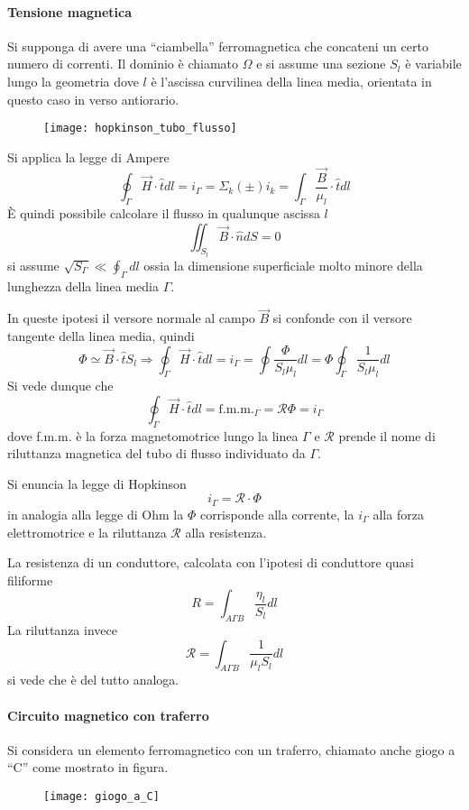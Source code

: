 \paragraph{Tensione magnetica}
Si supponga di avere una ``ciambella'' ferromagnetica che concateni un certo numero di 
correnti.
Il dominio è chiamato $\Omega$ e si assume una sezione $S_l$ è variabile lungo la 
geometria dove $l$ è l'ascissa curvilinea della linea media, orientata in questo caso in 
verso antiorario.
\begin{figure}[H]
\centering
\texttt{[image: hopkinson\_tubo\_flusso]}
\end{figure}

Si applica la legge di Ampere
$$
\oint_\Gamma \vec{H}\cdot \hat{t} dl = i_\Gamma = \Sigma_k (\pm)i_k = \int_{\Gamma}\frac{\vec{B}}{\mu_l} \cdot\hat{t}dl
$$
È quindi possibile calcolare il flusso in qualunque ascissa $l$ 
$$
\iint_{S_l}\vec{B}\cdot\hat{n} dS = 0
$$
si assume $\sqrt{S_\Gamma} \ll \oint_\Gamma dl$ ossia la dimensione superficiale molto
minore della lunghezza della linea media $\Gamma$.

In queste ipotesi il versore normale al campo $\vec{B}$ si confonde con il versore
tangente della linea media, quindi
$$
\Phi \simeq \vec{B}\cdot\hat{t}S_l \Rightarrow \oint_\Gamma \vec{H}\cdot\hat{t}dl = 
i_\Gamma = \oint\frac{\Phi}{S_l \mu_l} dl = \Phi\oint_\Gamma \frac{1}{S_l\mu_l}dl
$$
Si vede dunque che 
$$
\oint_\Gamma \vec{H}\cdot\hat{t}dl = \text{f.m.m.}_{\Gamma} = \mathcal{R} \Phi = i_\Gamma
$$
dove f.m.m. è la forza magnetomotrice lungo la linea $\Gamma$ e $\mathcal{R}$ prende
il nome di riluttanza magnetica del tubo di flusso individuato da $\Gamma$.

Si enuncia la legge di Hopkinson
$$
i_\Gamma = \mathcal{R}\cdot\Phi
$$
in analogia alla legge di Ohm la $\Phi$ corrisponde alla corrente, la $i_\Gamma$ alla 
forza elettromotrice e la riluttanza $\mathcal{R}$ alla resistenza.

La resistenza di un conduttore, calcolata con l'ipotesi di conduttore quasi filiforme
$$
R = \int_{A\Gamma B} \frac{\eta_l}{S_l}dl
$$
La riluttanza invece
$$
\mathcal{R} = \int_{A\Gamma B} \frac{1}{\mu_l S_l}dl
$$
si vede che è del tutto analoga.

\newpage
\paragraph{Circuito magnetico con traferro}
Si considera un elemento ferromagnetico con un traferro, chiamato anche giogo a ``C'' 
come mostrato in figura.
\begin{figure}
\centering
\texttt{[image: giogo\_a\_C]}
\end{figure}

